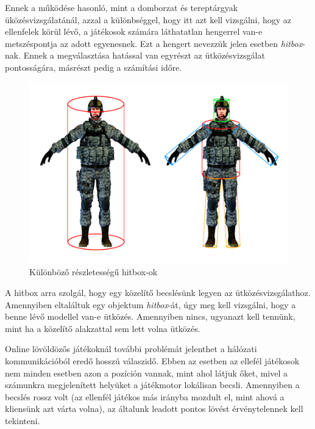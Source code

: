 Ennek a működése hasonló, mint a domborzat és tereptárgyak üközésvizsgálatánál, azzal a különbséggel, hogy itt azt kell vizsgálni, hogy az ellenfelek körül lévő, a játékosok számára láthatatlan hengerrel van-e metszéspontja az adott egyenesnek. Ezt a hengert nevezzük jelen esetben \textit{hitbox}-nak. Ennek a megválasztása hatással van egyrészt az ütközésvizsgálat pontosságára, másrészt pedig a számítási időre.

\begin{figure}[h]
\centering
\includegraphics[scale=0.38]{kepek/hitbox.png}
\caption{Különböző részletességű hitbox-ok}
\label{fig:hitbox}
\end{figure}

A hitbox arra szolgál, hogy egy közelítő becslésünk legyen az ütközésvizsgálathoz. Amennyiben eltaláltuk egy objektum \textit{hitbox}-át, úgy meg kell vizsgálni, hogy a benne lévő modellel van-e ütközés. Amennyiben nincs, ugyanazt kell tennünk, mint ha a közelítő alakzattal sem lett volna ütközés.


Online lövöldözős játékoknál további problémát jelenthet a hálózati kommunikációból eredő hosszú válaszidő. Ebben az esetben az ellefél játékosok nem minden esetben azon a pozíción vannak, mint ahol látjuk őket, mivel a számunkra megjelenített helyüket a játékmotor lokálisan becsli. Amennyiben a becslés rossz volt (az ellenfél játékos más irányba mozdult el, mint ahová a kliensünk azt várta volna), az általunk leadott pontos lövést érvénytelennek kell tekinteni.

